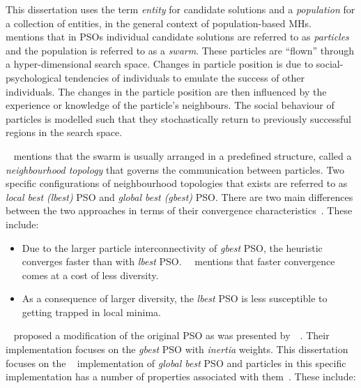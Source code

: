 This dissertation uses the term \textit{entity} for candidate solutions and a \textit{population} for a collection of entities, in the general context of population-based \acp{MH}.~\citeauthor{ref:engelbrecht:2007}~\cite{ref:engelbrecht:2007} mentions that in \acp{PSO} individual candidate solutions are referred to as \textit{particles} and the population is referred to as a \textit{swarm}. These particles are ``flown'' through a hyper-dimensional search space. Changes in particle position is due to social-psychological tendencies of individuals to emulate the success of other individuals. The changes in the particle position are then influenced by the experience or knowledge of the particle's neighbours. The social behaviour of particles is modelled such that they stochastically return to previously successful regions in the search space.

\citeauthor{ref:vanwyk:2014}~\cite{ref:vanwyk:2014} mentions that the swarm is usually arranged in a predefined structure, called a \textit{neighbourhood topology} that governs the communication between particles. Two specific configurations of neighbourhood topologies that exists are referred to as \textit{local best (lbest)} \acs{PSO} and \textit{global best (gbest)} \acs{PSO}. There are two main differences between the two approaches in terms of their convergence characteristics~\cite{ref:eberhart:1996}. These include:

\begin{itemize}
	\item Due to the larger particle interconnectivity of \textit{gbest} \acs{PSO}, the heuristic converges faster than with \textit{lbest} \acs{PSO}.~\citeauthor{ref:engelbrecht:2007}~\cite{ref:engelbrecht:2007} mentions that faster convergence comes at a cost of less diversity.

	\item As a consequence of larger diversity, the \textit{lbest} \acs{PSO} is less susceptible to getting trapped in local minima.
\end{itemize}

\citeauthor{ref:shi:1998}~\cite{ref:shi:1998} proposed a modification of the original \acs{PSO} as was presented by~\citeauthor{ref:kennedy:1995}~\cite{ref:kennedy:1995}. Their implementation focuses on the \textit{gbest} \acs{PSO} with \textit{inertia} weights. This dissertation focuses on the \citeauthor{ref:shi:1998}~\cite{ref:shi:1998} implementation of \textit{global best} \acs{PSO} and particles in this specific implementation has a number of properties associated with them~\cite{ref:vanwyk:2014}. These include:

